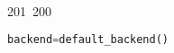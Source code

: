 201~200~\documentclass{article}
\begin{document}
\begin{lstlisting}[language=Python, caption=Shared Secret Computation and Encryption Key Derivation]
	                                                                                                                                                                                                                                                                                                	                                                                                                                                        	    	                                                                                                	                                                                                                                                                                                                                                                                                                                                	                                                                        	                                                                        	                                                                                                                                        	                                                                                                                                                                                                                        	                                        backend=default_backend()
	                                                                                                                                                                                                                                                                                                	                                                                                                                                        	    	                                                                                                	                                                                                                                                                                                                                                                                                                                                	                                                                        	                                                                        	                                                                                                                                        	                                                                                                                                                                                                                        	                                            )

\end{lstlisting}
\end{document}
